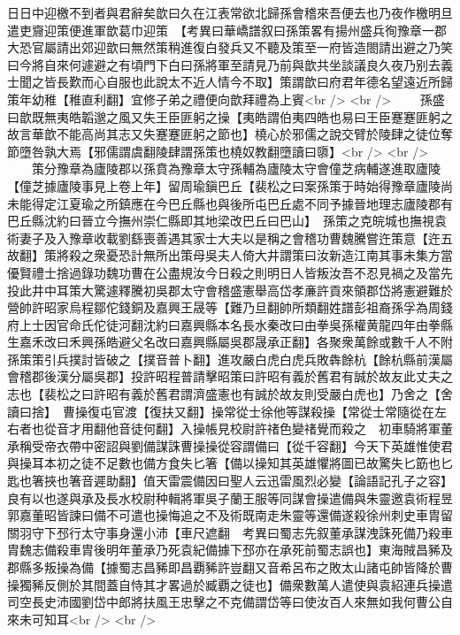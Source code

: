 日日中迎檄不到者與君辭矣歆曰久在江表常欲北歸孫會稽來吾便去也乃夜作檄明旦遣吏齎迎策便進軍歆葛巾迎策　【考異曰華嶠譜叙曰孫策畧有揚州盛兵徇豫章一郡大恐官屬請出郊迎歆曰無然策稍進復白發兵又不聽及策至一府皆造閤請出避之乃笑曰今將自來何遽避之有頃門下白曰孫將軍至請見乃前與歆共坐談議良久夜乃别去義士聞之皆長歎而心自服也此說太不近人情今不取】策謂歆曰府君年德名望遠近所歸策年幼稚【稚直利翻】宜修子弟之禮便向歆拜禮為上賓<br />
<br />
　　孫盛曰歆既無夷皓韜邈之風又失王臣匪躬之操【夷皓謂伯夷四皓也易曰王臣蹇蹇匪躬之故言華歆不能高尚其志又失蹇蹇匪躬之節也】橈心於邪儒之說交臂於陵肆之徒位奪節墮咎孰大焉【邪儒謂虞翻陵肆謂孫策也橈奴教翻墮讀曰隳】<br />
<br />
　　策分豫章為廬陵郡以孫賁為豫章太守孫輔為廬陵太守會僮芝病輔遂進取廬陵【僮芝據廬陵事見上卷上年】留周瑜鎭巴丘【裴松之曰案孫策于時始得豫章廬陵尚未能得定江夏瑜之所鎮應在今巴丘縣也與後所屯巴丘處不同予據晉地理志廬陵郡有巴丘縣沈約曰晉立今撫州崇仁縣即其地梁改巴丘曰巴山】　孫策之克皖城也撫視袁術妻子及入豫章收載劉繇喪善遇其家士大夫以是稱之會稽功曹魏騰嘗迕策意【迕五故翻】策將殺之衆憂恐計無所出策母吳夫人倚大井謂策曰汝新造江南其事未集方當優賢禮士捨過錄功魏功曹在公盡規汝今日殺之則明日人皆叛汝吾不忍見禍之及當先投此井中耳策大驚遽釋騰初吳郡太守會稽盛憲舉高岱孝亷許貢來領郡岱將憲避難於營帥許昭家烏程鄒佗錢銅及嘉興王晟等【難乃旦翻帥所類翻姓譜彭祖裔孫孚為周錢府上士因官命氏佗徒河翻沈約曰嘉興縣本名長水秦改曰由拳吳孫權黄龍四年由拳縣生嘉禾改曰禾興孫皓避父名改曰嘉興縣屬吳郡晟承正翻】各聚衆萬餘或數千人不附孫策策引兵撲討皆破之【撲音普卜翻】進攻嚴白虎白虎兵敗犇餘杭【餘杭縣前漢屬會稽郡後漢分屬吳郡】投許昭程普請擊昭策曰許昭有義於舊君有誠於故友此丈夫之志也【裴松之曰許昭有義於舊君謂濟盛憲也有誠於故友則受嚴白虎也】乃舍之【舍讀曰捨】　曹操復屯官渡【復扶又翻】操常從士徐他等謀殺操【常從士常隨從在左右者也從音才用翻他音徒何翻】入操帳見校尉許禇色變禇覺而殺之　初車騎將軍董承稱受帝衣帶中密詔與劉備謀誅曹操操從容謂備曰【從千容翻】今天下英雄惟使君與操耳本初之徒不足數也備方食失匕箸【備以操知其英雄懼將圖已故驚失匕筯也匕匙也箸挾也箸音遲助翻】值天雷震備因曰聖人云迅雷風烈必變【論語記孔子之容】良有以也遂與承及長水校尉种輯將軍吳子蘭王服等同謀會操遣備與朱靈邀袁術程昱郭嘉董昭皆諫曰備不可遣也操悔追之不及術既南走朱靈等還備遂殺徐州刺史車胄留關羽守下邳行太守事身還小沛【車尺遮翻　考異曰蜀志先叙董承謀洩誅死備乃殺車胄魏志備殺車胄後明年董承乃死袁紀備據下邳亦在承死前蜀志誤也】東海賊昌豨及郡縣多叛操為備【據蜀志昌豨即昌覇豨許豈翻又音希呂布之敗太山諸屯帥皆降於曹操獨豨反側於其間蓋自恃其才畧過於臧覇之徒也】備衆數萬人遣使與袁紹連兵操遣司空長史沛國劉岱中郎將扶風王忠擊之不克備謂岱等曰使汝百人來無如我何曹公自來未可知耳<br />
<br />
